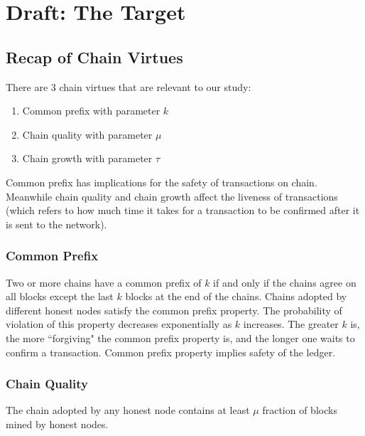 \chapter{Draft: The Target}

\section{Recap of Chain Virtues}
There are 3 chain virtues that are relevant to our study:

\begin{enumerate}
    \item Common prefix with parameter $k$
    \item Chain quality with parameter $\mu$
    \item Chain growth with parameter $\tau$
\end{enumerate}


Common prefix has implications for the safety of transactions on chain. Meanwhile chain quality and chain growth affect the liveness of transactions (which refers to how much time it takes for a transaction to be confirmed after it is sent to the network).

\subsection{Common Prefix}

Two or more chains have a common prefix of $k$ if and only if the chains agree on all blocks except the last $k$ blocks at the end of the chains.
Chains adopted by different honest nodes satisfy the common prefix property.
The probability of violation of this property decreases exponentially as $k$ increases. The greater $k$ is, the more ``forgiving" the common prefix property is, and the longer one waits to confirm a transaction.
Common prefix property implies safety of the ledger.

\subsection{Chain Quality}
The chain adopted by any honest node contains at least $\mu$ fraction of blocks mined by honest nodes.

